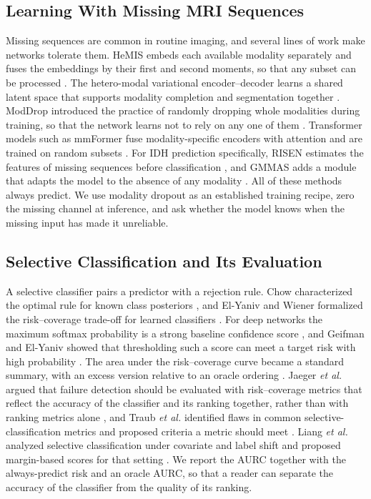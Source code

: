 \documentclass[journal]{IEEEtran}
\begin{document}
\subsection{Learning With Missing MRI Sequences}
Missing sequences are common in routine imaging, and several lines of work make networks tolerate them. HeMIS embeds each available modality separately and fuses the embeddings by their first and second moments, so that any subset can be processed \cite{havaei2016}. The hetero-modal variational encoder--decoder learns a shared latent space that supports modality completion and segmentation together \cite{dorent2019}. ModDrop introduced the practice of randomly dropping whole modalities during training, so that the network learns not to rely on any one of them \cite{neverova2016}. Transformer models such as mmFormer fuse modality-specific encoders with attention and are trained on random subsets \cite{zhang2022mmformer}. For IDH prediction specifically, RISEN estimates the features of missing sequences before classification \cite{liang2026risen}, and GMMAS adds a module that adapts the model to the absence of any modality \cite{liu2026gmmas}. All of these methods always predict. We use modality dropout as an established training recipe, zero the missing channel at inference, and ask whether the model knows when the missing input has made it unreliable.

\subsection{Selective Classification and Its Evaluation}
A selective classifier pairs a predictor with a rejection rule. Chow characterized the optimal rule for known class posteriors \cite{chow1970}, and El-Yaniv and Wiener formalized the risk--coverage trade-off for learned classifiers \cite{elyaniv2010}. For deep networks the maximum softmax probability is a strong baseline confidence score \cite{hendrycks2017}, and Geifman and El-Yaniv showed that thresholding such a score can meet a target risk with high probability \cite{geifman2017}. The area under the risk--coverage curve became a standard summary, with an excess version relative to an oracle ordering \cite{geifman2019}. Jaeger \emph{et al.} argued that failure detection should be evaluated with risk--coverage metrics that reflect the accuracy of the classifier and its ranking together, rather than with ranking metrics alone \cite{jaeger2023}, and Traub \emph{et al.} identified flaws in common selective-classification metrics and proposed criteria a metric should meet \cite{traub2024}. Liang \emph{et al.} analyzed selective classification under covariate and label shift and proposed margin-based scores for that setting \cite{liang2024selective}. We report the AURC together with the always-predict risk and an oracle AURC, so that a reader can separate the accuracy of the classifier from the quality of its ranking.
\end{document}
